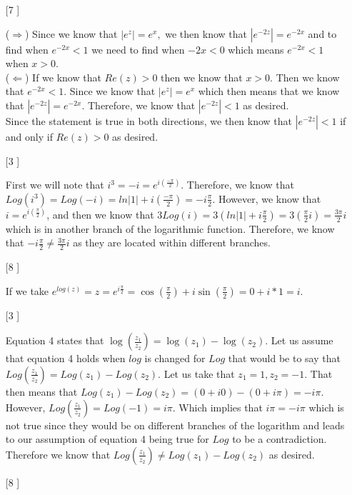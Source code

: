 \documentclass{article}
\theoremstyle{definition}
\begin{document}
\begin{enumerate}
    \item [[\phantom{-}7]]
    
    ($\Rightarrow$) Since we know that $|e^z| = e^x,$ we then know that $|e^{-2z}| = e^{-2x}$ and to find when $e^{-2x} < 1$ we need to find when $-2x < 0$ which means $e^{-2x} < 1$ when $x > 0$.\\
    ($\Leftarrow$) If we know that $Re(z) > 0$ then we know that $x > 0$. Then we know that $e^{-2x} < 1$. Since we know that $|e^{z}| = e^x$ which then means that we know that $|e^{-2z}| = e^{-2x}$. Therefore, we know that $|e^{-2z}| < 1$ as desired.\\
    Since the statement is true in both directions, we then know that $|e^{-2z}| < 1$ if and only if $Re(z) > 0$ as desired.
    
    \item [[\phantom{-}3]]
    
    First we will note that $i^3 = -i = e^{i(\frac{-\pi}{2})}$. Therefore, we know that $Log(i^3) = Log(-i) = ln|1| + i(\frac{-\pi}{2}) = -i\frac{\pi}{2}$. However, we know that $i = e^{i(\frac{\pi}{2})}$, and then we know that $3Log(i) = 3(ln|1| + i\frac{\pi}{2}) = 3(\frac{\pi}{2}i) = \frac{3\pi}{2}i$ which is in another branch of the logarithmic function. Therefore, we know that $-i\frac{\pi}{2} \neq \frac{3\pi}{2}i$ as they are located within different branches.
    
    \item [[\phantom{-}8]]
    
    If we take $e^{log(z)} = z = e^{i\frac{\pi}{2}} = \cos(\frac{\pi}{2}) + i\sin(\frac{\pi}{2}) = 0 + i * 1 = i$.
    
    \item [[\phantom{-}3]]
    
    Equation 4 states that $\log(\frac{z_1}{z_2}) = \log(z_1) - \log(z_2)$. Let us assume that equation 4 holds when $log$ is changed for $Log$ that would be to say that $Log(\frac{z_1}{z_2}) = Log(z_1) - Log(z_2)$. Let us take that $z_1 = 1, z_2 = -1$. That then means that $Log(z_1) - Log(z_2) = (0 + i0) - (0 + i\pi) = -i\pi.$ However, $Log(\frac{z_1}{z_2}) = Log(-1) = i\pi$. Which implies that $i\pi = -i\pi$ which is not true since they would be on different branches of the logarithm and leads to our assumption of equation 4 being true for $Log$ to be a contradiction. Therefore we know that $Log(\frac{z_1}{z_2}) \neq Log(z_1)-Log(z_2)$ as desired.
    
    \item [[\phantom{-}8]]
    

\end{enumerate}
\end{document}
